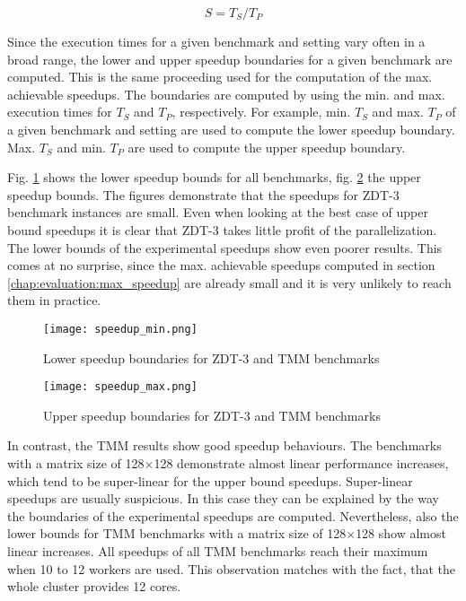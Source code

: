 \begin{equation}
S = T_S / T_P
\end{equation}

Since the execution times for a given benchmark and setting vary often in a broad range, the lower and upper speedup boundaries for a given benchmark are computed. This is the same proceeding used for the computation of the max. achievable speedups. The boundaries are computed by using the min. and max. execution times for $T_S$ and $T_P$, respectively. For example, min. $T_S$ and max. $T_P$ of a given benchmark and setting are used to compute the lower speedup boundary. Max. $T_S$ and min. $T_P$ are used to compute the upper speedup boundary.

Fig. \ref{fig:speedup_min} shows the lower speedup bounds for all benchmarks, fig. \ref{fig:speedup_max} the upper speedup bounds. The figures demonstrate that the speedups for ZDT-3 benchmark instances are small. Even when looking at the best case of upper bound speedups it is clear that ZDT-3 takes little profit of the parallelization. The lower bounds of the experimental speedups show even poorer results. This comes at no surprise, since the max. achievable speedups computed in section \ref{chap:evaluation:max_speedup} are already small and it is very unlikely to reach them in practice.

\begin{figure}
  \centering
  \texttt{[image: speedup\_min.png]}
  \caption[Lower speedup boundaries for ZDT-3 and TMM benchmarks]{Lower speedup boundaries for ZDT-3 and TMM benchmarks}
  \label{fig:speedup_min}
\end{figure}
\begin{figure}
  \centering
  \texttt{[image: speedup\_max.png]}
  \caption[Upper speedup boundaries for ZDT-3 and TMM benchmarks]{Upper speedup boundaries for ZDT-3 and TMM benchmarks}
  \label{fig:speedup_max}
\end{figure}

In contrast, the TMM results show good speedup behaviours. The benchmarks with a matrix size of 128$\times$128 demonstrate almost linear performance increases, which tend to be super-linear for the upper bound speedups. Super-linear speedups are usually suspicious. In this case they can be explained by the way the boundaries of the experimental speedups are computed. Nevertheless, also the lower bounds for TMM benchmarks with a matrix size of 128$\times$128 show almost linear increases. All speedups of all TMM benchmarks reach their maximum when 10 to 12 workers are used. This observation matches with the fact, that the whole cluster provides 12 cores.

